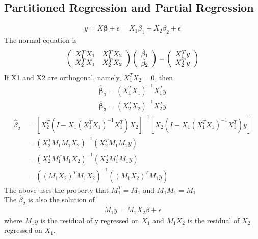 \documentclass[a4paper]{article}
\begin{document}
\subsection{Partitioned Regression and Partial Regression}
\begin{align*}
y = X \boldsymbol \beta + \epsilon = X_1 \beta_1 + X_2 \beta_2 + \epsilon
\end{align*}
The normal equation is
\begin{align*}
 \left( \begin{array} { c  c } 
                   X_1^TX_1 & X_1^TX_2  \\
                   X_2^TX_1 & X_2^TX_2   \\
           \end{array} \right)
 \left( \begin{array} { c  } 
                   \hat \beta_1   \\
                   \hat \beta_2   \\
           \end{array} \right) =
\left( \begin{array} { c  } 
                   X_1^T y   \\
                   X_2^T y   \\
           \end{array} \right)
\end{align*}
If X1 and X2 are orthogonal, namely, $X_1^T X_2=0$, then 
\begin{align*}
\boldsymbol {\hat  \beta_1} = (X_1^T X_1)^{-1} X_1^Ty\\
\boldsymbol {\hat  \beta_2} = (X_2^T X_2)^{-1} X_2^Ty
\end{align*}
\begin{align*}
\hat \beta_2 & = [X_2^T(I-X_1(X_1^TX_1)^{-1}X_1^T)X_2]^{-1}[X_2(I-X_1(X_1^TX_1)^{-1}X_1^T)y]\\
& = (X_2^T M_1 M_1X_2)^{-1}(X_2^T M_1 M_1y) \\
& = (X_2^T M_1^T M_1X_2)^{-1}(X_2^TM_1^T M_1y) \\
& = ((M_1 X_2)^T  M_1X_2)^{-1}((M_1 X_2)^T M_1y) 
\end{align*}
The above uses the property that $M_1^T=M_1$ and $M_1 M_1 = M_1$\\
The $\hat \beta_2$ is also the solution of 
\begin{align*}
 M_1 y = M_1 X_2 \beta + \epsilon
\end{align*}
where $M_1 y$ is the residual of y regressed on $X_1$ and $M_1 X_2$ is the residual of $X_2$ regressed on $X_1$.
\end{document}
